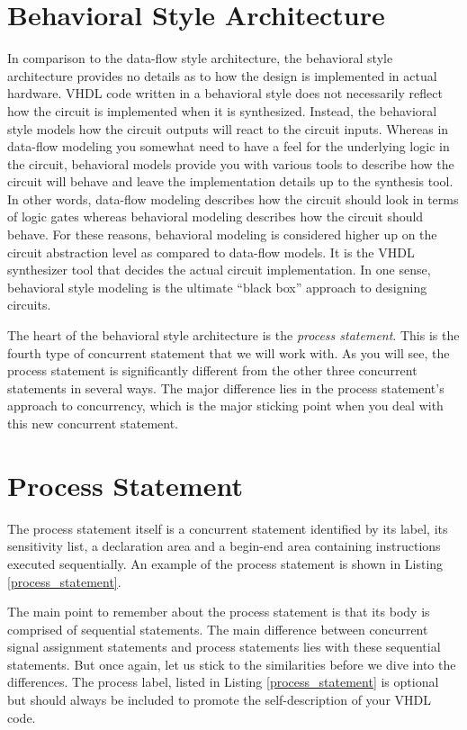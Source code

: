 \section{Behavioral Style Architecture}
In comparison to the data-flow style architecture, the behavioral style architecture provides no details as to how the design is implemented in actual hardware. VHDL code written in a behavioral style does not necessarily reflect how the circuit is implemented when it is synthesized. Instead, the behavioral style models how the circuit outputs will react to the circuit inputs. Whereas in data-flow modeling you somewhat need to have a feel for the underlying logic in the circuit, behavioral models provide you with various tools to describe how the circuit will behave and leave the implementation details up to the synthesis tool. In other words, data-flow modeling describes how the circuit should look in terms of logic gates whereas behavioral modeling describes how the circuit should behave. For these reasons, behavioral modeling is considered higher up on the circuit abstraction level as compared to data-flow models. It is the VHDL synthesizer tool that decides the actual circuit implementation. In one sense, behavioral style modeling is the ultimate ``black box'' approach to designing circuits.

The heart of the behavioral style architecture is the \textit{process statement}. This is the fourth type of concurrent statement that we will work with. As you will see, the process statement is significantly different from the other three concurrent statements in several ways. The major difference lies in the process statement's approach to concurrency, which is the major sticking point when you deal with this new concurrent statement.

\section{Process Statement}
The process statement itself is a concurrent statement identified by its label, its sensitivity list, a declaration area and a begin-end area containing instructions executed sequentially. An example of the process statement is shown in Listing \ref{process_statement}. 

The main point to remember about the process statement is that its body is comprised of sequential statements. The main difference between concurrent signal assignment statements and process statements lies with these sequential statements. But once again, let us stick to the similarities before we dive into the differences. The process label, listed in Listing \ref{process_statement} is optional but should always be included to promote the self-description of your VHDL code.

